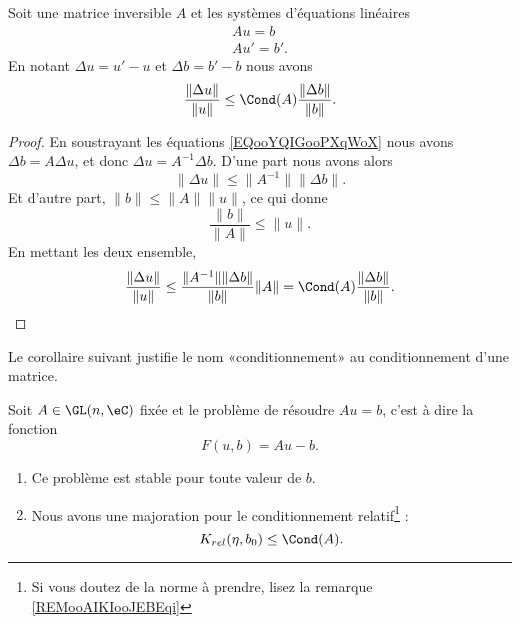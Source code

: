 \begin{proposition}        \label{PROPooGIXFooAhJkIs}
    Soit une matrice inversible \( A\) et les systèmes d'équations linéaires
    \begin{subequations}        \label{EQooYQIGooPXqWoX}
        \begin{align}
            Au=b\\
            Au'=b'.
        \end{align}
    \end{subequations}
    En notant \( \Delta u=u'-u\) et \( \Delta b=b'-b\) nous avons
    \begin{equation}        \label{EQooESXRooMYuvRa}
        \frac{ \| \Delta u \| }{ \| u \| }\leq \Cond(A)\frac{ \| \Delta b \| }{ \| b \| }.
    \end{equation}
\end{proposition}

\begin{proof}
    En soustrayant les équations \eqref{EQooYQIGooPXqWoX} nous avons \( \Delta b=A\Delta u\), et donc \( \Delta u=A^{-1} \Delta b\). D'une part nous avons alors
    \begin{equation}
        \| \Delta u \|\leq \| A^{-1} \|\| \Delta b \|.
    \end{equation}
    Et d'autre part, \( \| b \|\leq \| A \|\| u \|\), ce qui donne
    \begin{equation}
        \frac{ \| b \| }{ \| A \| }\leq \| u \|.
    \end{equation}
    En mettant les deux ensemble,
    \begin{equation}
        \frac{ \| \Delta u \| }{ \| u \| }\leq \frac{ \| A^{-1} \|\| \Delta b \| }{ \| b \| }\| A \|=\Cond(A)\frac{ \| \Delta b \| }{ \| b \| }.
    \end{equation}
\end{proof}

Le corollaire suivant justifie le nom «conditionnement» au conditionnement d'une matrice.
\begin{corollary}       \label{CORooXKPWooJVHVvh}
    Soit \( A\in \GL(n,\eC)\) fixée et le problème de résoudre \( Au=b\), c'est à dire la fonction
    \begin{equation}
        F(u,b)=Au-b.
    \end{equation}
    \begin{enumerate}
        \item
            Ce problème est stable pour toute valeur de \( b\).
        \item
            Nous avons une majoration pour le conditionnement relatif\footnote{Si vous doutez de la norme à prendre, lisez la remarque \ref{REMooAIKIooJEBEqi}} :
            \begin{equation}        \label{EQooZHQJooTMKYfr}
                K_{rel}(\eta,b_0)\leq \Cond(A).
            \end{equation}
    \end{enumerate}
\end{corollary}

